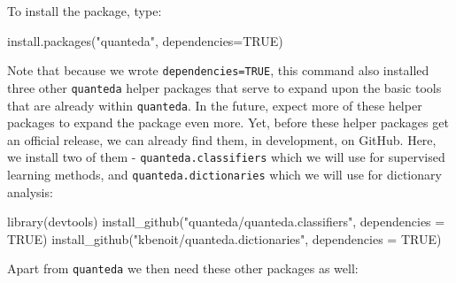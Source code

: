 \documentclass[
]{article}
\newenvironment{Shaded}{\begin{snugshade}}{\end{snugshade}}
\newcommand{\AttributeTok}[1]{\textcolor[rgb]{0.77,0.63,0.00}{#1}}
\newcommand{\ConstantTok}[1]{\textcolor[rgb]{0.00,0.00,0.00}{#1}}
\newcommand{\FunctionTok}[1]{\textcolor[rgb]{0.00,0.00,0.00}{#1}}
\newcommand{\NormalTok}[1]{#1}
\newcommand{\StringTok}[1]{\textcolor[rgb]{0.31,0.60,0.02}{#1}}
\begin{document}
To install the package, type:

\begin{Shaded}
\begin{Highlighting}[]
\FunctionTok{install.packages}\NormalTok{(}\StringTok{"quanteda"}\NormalTok{, }\AttributeTok{dependencies=}\ConstantTok{TRUE}\NormalTok{)}
\end{Highlighting}
\end{Shaded}

Note that because we wrote \texttt{dependencies=TRUE}, this command also installed three other \texttt{quanteda} helper packages that serve to expand upon the basic tools that are already within \texttt{quanteda}. In the future, expect more of these helper packages to expand the package even more. Yet, before these helper packages get an official release, we can already find them, in development, on GitHub. Here, we install two of them - \texttt{quanteda.classifiers} which we will use for supervised learning methods, and \texttt{quanteda.dictionaries} which we will use for dictionary analysis:

\begin{Shaded}
\begin{Highlighting}[]
\FunctionTok{library}\NormalTok{(devtools)}
\FunctionTok{install\_github}\NormalTok{(}\StringTok{"quanteda/quanteda.classifiers"}\NormalTok{, }\AttributeTok{dependencies =} \ConstantTok{TRUE}\NormalTok{)}
\FunctionTok{install\_github}\NormalTok{(}\StringTok{"kbenoit/quanteda.dictionaries"}\NormalTok{, }\AttributeTok{dependencies =} \ConstantTok{TRUE}\NormalTok{)}
\end{Highlighting}
\end{Shaded}

Apart from \texttt{quanteda} we then need these other packages as well:
\end{document}
